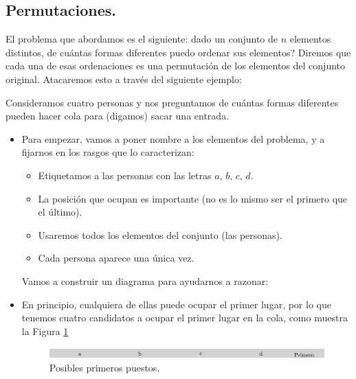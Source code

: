 \subsection{Permutaciones.}
\label{cap03:subsec:Permutaciones}

El problema que abordamos es el siguiente: dado un conjunto de $n$ elementos distintos, \textquestiondown de cu\'antas formas diferentes puedo ordenar
sus elementos? Diremos que cada una de esas ordenaciones es una  {\sf permutaci\'on} de los elementos del conjunto original.
Atacaremos esto a trav\'es del siguiente ejemplo:
    \begin{Ejemplo} Consideramos cuatro personas y nos preguntamos
	de cu\'antas formas diferentes pueden hacer cola para (digamos) sacar una entrada.
	\begin{itemize}
		\item Para empezar, vamos a poner nombre a los elementos del problema, y a fijarnos en
        los rasgos que lo caracterizan:
		\begin{itemize}
			\item Etiquetamos a las personas con las letras $a,\,b,\,c,\,d$.
            \item La posición que ocupan es importante (no es lo mismo ser el primero que el \'ultimo).
            \item Usaremos todos los elementos del conjunto (las personas).
            \item Cada persona aparece una \'unica vez.
		\end{itemize}
    	Vamos a construir un diagrama para ayudarnos a razonar:
	
        \item En principio, cualquiera de ellas puede ocupar el primer lugar, por lo que tenemos cuatro candidatos a ocupar el primer lugar en la cola, como muestra la Figura \ref{cap03:fig:arbol1}
        	\begin{center}
            \begin{figure}[h!]	
            \includegraphics[width=13cm]{../fig/Cap03-Permutaciones41.png}
            \caption{Posibles primeros puestos.}\label{cap03:fig:arbol1}
            \end{figure}
            \end{center}
	

\end{itemize}
\end{Ejemplo}
